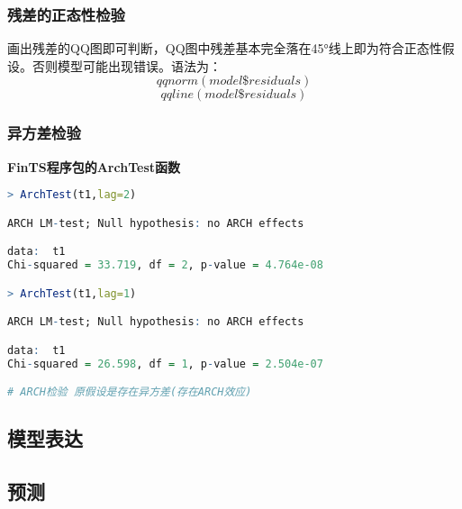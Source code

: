 \documentclass[11pt,a4paper,oneside]{book}
\begin{document}
\subsubsection{残差的正态性检验}
画出残差的QQ图即可判断，QQ图中残差基本完全落在45°线上即为符合正态性假设。否则模型可能出现错误。语法为：
\[qqnorm(model\$residuals)\]
\[qqline(model\$residuals)\]
\subsubsection{异方差检验}
\textbf{FinTS程序包的ArchTest函数}
\begin{lstlisting}[language=r]
> ArchTest(t1,lag=2)

ARCH LM-test; Null hypothesis: no ARCH effects

data:  t1
Chi-squared = 33.719, df = 2, p-value = 4.764e-08

> ArchTest(t1,lag=1)

ARCH LM-test; Null hypothesis: no ARCH effects

data:  t1
Chi-squared = 26.598, df = 1, p-value = 2.504e-07

# ARCH检验 原假设是存在异方差(存在ARCH效应)
\end{lstlisting}

\subsection{模型表达}

\subsection{预测}
\end{document}
